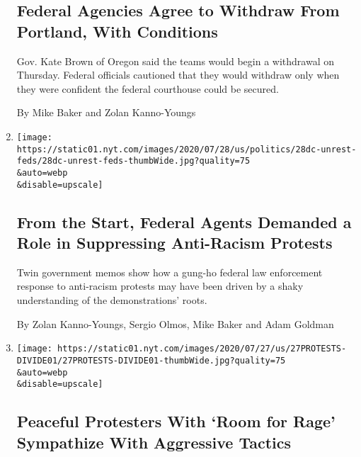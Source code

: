 \begin{enumerate}
  \hypertarget{federal-agencies-agree-to-withdraw-from-portland-with-conditions}{%
  \subsection{Federal Agencies Agree to Withdraw From Portland, With
  Conditions}\label{federal-agencies-agree-to-withdraw-from-portland-with-conditions}}

  Gov. Kate Brown of Oregon said the teams would begin a withdrawal on
  Thursday. Federal officials cautioned that they would withdraw only
  when they were confident the federal courthouse could be secured.

  By Mike Baker and Zolan Kanno-Youngs
\item
  \href{/2020/07/28/us/federal-agents-portland-seattle-protests.html}{}

  \texttt{[image: https://static01.nyt.com/images/2020/07/28/us/politics/28dc-unrest-feds/28dc-unrest-feds-thumbWide.jpg?quality=75\\\&auto=webp\\\&disable=upscale]}

  \hypertarget{from-the-start-federal-agents-demanded-a-role-in-suppressing-anti-racism-protests}{%
  \subsection{From the Start, Federal Agents Demanded a Role in
  Suppressing Anti-Racism
  Protests}\label{from-the-start-federal-agents-demanded-a-role-in-suppressing-anti-racism-protests}}

  Twin government memos show how a gung-ho federal law enforcement
  response to anti-racism protests may have been driven by a shaky
  understanding of the demonstrations' roots.

  By Zolan Kanno-Youngs, Sergio Olmos, Mike Baker and Adam Goldman
\item
  \href{/2020/07/27/us/protests-divisions-blm.html}{}

  \texttt{[image: https://static01.nyt.com/images/2020/07/27/us/27PROTESTS-DIVIDE01/27PROTESTS-DIVIDE01-thumbWide.jpg?quality=75\\\&auto=webp\\\&disable=upscale]}

  \hypertarget{peaceful-protesters-with-room-for-rage-sympathize-with-aggressive-tactics}{%
  \subsection{Peaceful Protesters With `Room for Rage' Sympathize With
  Aggressive
  Tactics}\label{peaceful-protesters-with-room-for-rage-sympathize-with-aggressive-tactics}}


\end{enumerate}
